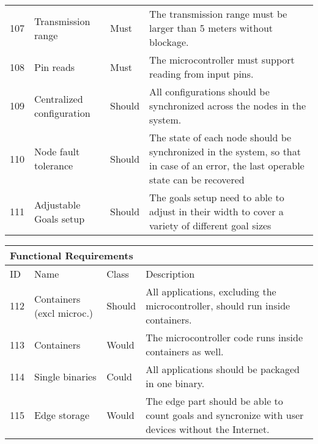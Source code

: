 \begin{table}[]
\begin{tabular}[t]{ l p{2.4cm} l p{7.6cm}}
        107 & Transmission range        & Must           & The transmission range must be larger than 5 meters without blockage.                                                              \\
        108 & Pin reads                 & Must           & The microcontroller must support reading from input pins.                                                                          \\
        109 & Centralized configuration & Should         & All configurations should be synchronized across the nodes in the system.                                                          \\
        110 & Node fault tolerance      & Should         & The state of each node should be synchronized in the system, so that in case of an error, the last operable state can be recovered \\
        111 & Adjustable Goals setup    & Should         & The goals setup need to able to adjust in their width to cover a variety of different goal sizes                                   \\                  
        \end{tabular}\label{tab:funcReq}
    \end{table}
\begin{table}[]
    \begin{tabular}[t]{ l p{2.4cm} l p{7.6cm}}
        \multicolumn{4}{l}{Functional Requirements}                                                                                                                                           \\ \hline
        ID  & Name                      & Class & Description                                                                                                                        \\ \hline
        112 & Containers (excl microc.) & Should         & All applications, excluding the microcontroller, should run inside containers.                                                     \\      
        113 & Containers                & Would          & The microcontroller code runs inside containers as well.                                                                           \\
        114 & Single binaries           & Could          & All applications should be packaged in one binary.                                                                                 \\
        115 & Edge storage              & Would          & The edge part should be able to count goals and syncronize with user devices without the Internet.                                 \\                         
        \end{tabular}\label{tab:funcReq}
    \end{table}

